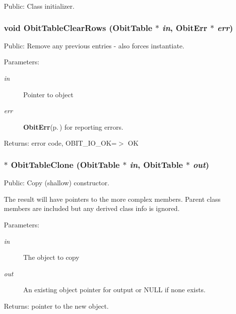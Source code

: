 Public: Class initializer. 

\subsubsection{\setlength{\rightskip}{0pt plus 5cm}void Obit\-Table\-Clear\-Rows ({\bf Obit\-Table} $\ast$ {\em in}, {\bf Obit\-Err} $\ast$ {\em err})}\label{ObitTable_8h_a32}


Public: Remove any previous entries - also forces instantiate. 

\begin{Desc}
\item[Parameters:]
\begin{description}
\item[{\em in}]Pointer to object \item[{\em err}]{\bf Obit\-Err}{\rm (p.\,\pageref{structObitErr})} for reporting errors. \end{description}
\end{Desc}
\begin{Desc}
\item[Returns:]error code, OBIT\_\-IO\_\-OK=$>$ OK \end{Desc}
\subsubsection{$\ast$ Obit\-Table\-Clone ({\bf Obit\-Table} $\ast$ {\em in}, {\bf Obit\-Table} $\ast$ {\em out})}\label{ObitTable_8h_a36}


Public: Copy (shallow) constructor. 

The result will have pointers to the more complex members. Parent class members are included but any derived class info is ignored. \begin{Desc}
\item[Parameters:]
\begin{description}
\item[{\em in}]The object to copy \item[{\em out}]An existing object pointer for output or NULL if none exists. \end{description}
\end{Desc}
\begin{Desc}
\item[Returns:]pointer to the new object. \end{Desc}
